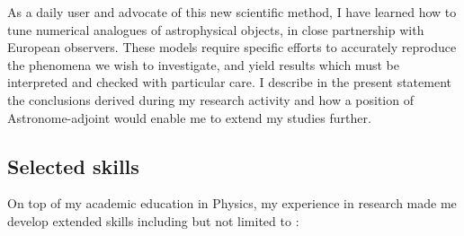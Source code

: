 \documentclass[a4paper,12pt,onecolumn]{article}
\begin{document}
As a daily user and advocate of this new scientific method, I have learned how to tune numerical analogues of astrophysical objects, in close partnership with European observers. These models require specific efforts to accurately reproduce the phenomena we wish to investigate, and yield results which must be interpreted and checked with particular care. I describe in the present statement the conclusions derived during my research activity and how a position of Astronome-adjoint would enable me to extend my studies further.

\subsection*{Selected skills}

On top of my academic education in Physics, my experience in research made me develop extended skills including but not limited to :
\end{document}
